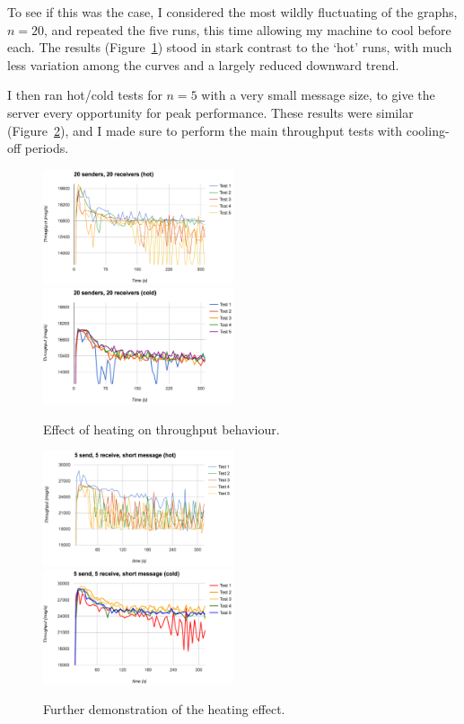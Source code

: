 To see if this was the case, I considered the most wildly fluctuating of the graphs, $n=20$, and repeated the five runs, this time allowing my machine to cool before each. The results (Figure~\ref{fig:20hotcold}) stood in stark contrast to the `hot' runs, with much less variation among the curves and a largely reduced downward trend.

I then ran hot/cold tests for $n=5$ with a very small message size, to give the server every opportunity for peak performance. These results were similar (Figure~\ref{fig:5hotcold}), and I made sure to perform the main throughput tests with cooling-off periods.

\begin{figure}
  \includegraphics[width=0.5\textwidth]{../transcripts/lipsum/20n20/hot/hot.png}
  \includegraphics[width=0.5\textwidth]{../transcripts/lipsum/20n20/cold/cold.png}
  \caption{Effect of heating on throughput behaviour.}
  \label{fig:20hotcold}
\end{figure}

\begin{figure}
  \includegraphics[width=0.5\textwidth]{../transcripts/hi/5n5/hot/hot.png}
  \includegraphics[width=0.5\textwidth]{../transcripts/hi/5n5/cold/cold.png}
  \caption{Further demonstration of the heating effect.}
  \label{fig:5hotcold}
\end{figure}

